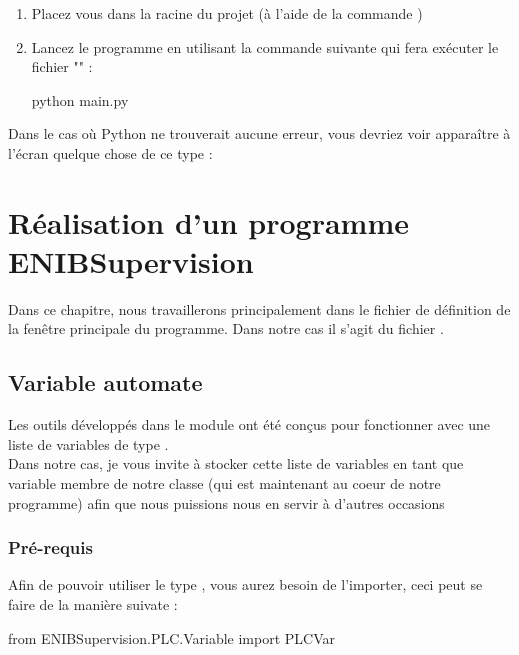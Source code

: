 {\begin{enumerate}
\item Placez vous dans la racine du projet (à l'aide de la commande )
    
\item Lancez le programme en utilisant la commande suivante qui fera exécuter le fichier "" :
\begin{Python}
    python main.py
\end{Python}
\end{enumerate}



Dans le cas où Python ne trouverait aucune erreur, vous devriez voir apparaître à l'écran quelque chose de ce type :





\chapter{Réalisation d'un programme ENIBSupervision}

Dans ce chapitre, nous travaillerons principalement dans le fichier de définition de la fenêtre principale du programme. Dans notre cas il s'agit du fichier .\\




\section{Variable automate}

Les outils développés dans le module  ont été conçus pour fonctionner avec une liste de variables de type .\\

Dans notre cas, je vous invite à stocker cette liste de variables en tant que variable membre de notre classe  (qui est maintenant au coeur de notre programme) afin que nous puissions nous en servir à d'autres occasions

\subsection{Pré-requis}

Afin de pouvoir utiliser le type , vous aurez besoin de l'importer, ceci peut se faire de la manière suivate :
\begin{Python}
from ENIBSupervision.PLC.Variable import PLCVar
\end{Python}

}
